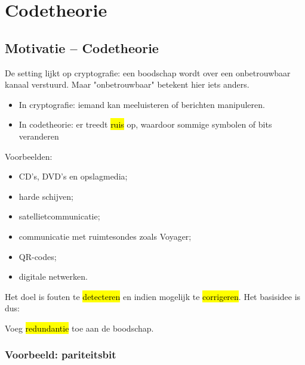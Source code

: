 \section*{Codetheorie}


\subsection{Motivatie -- Codetheorie}

De setting lijkt op cryptografie: een boodschap wordt over een onbetrouwbaar kanaal verstuurd. Maar "onbetrouwbaar" betekent hier iets anders.
\begin{itemize}
    \item In cryptografie: iemand kan meeluisteren of berichten manipuleren.
    \item In codetheorie: er treedt \hl{ruis} op, waardoor sommige symbolen of bits veranderen
\end{itemize}

\begin{center}
\resizebox{0.60\textwidth}{!}{%
    
}
\end{center}

Voorbeelden:
\begin{itemize}
    \item CD's, DVD's en opslagmedia;
    \item harde schijven;
    \item satellietcommunicatie;
    \item communicatie met ruimtesondes zoals Voyager;
    \item QR-codes;
    \item digitale netwerken.
\end{itemize}
Het doel is fouten te \hl{detecteren} en indien mogelijk te \hl{corrigeren}. Het basisidee is dus:
\begin{center}
    Voeg \hl{redundantie} toe aan de boodschap.
\end{center}

\subsubsection{Voorbeeld: pariteitsbit}\label{sec:l8_pariteitsbit}

